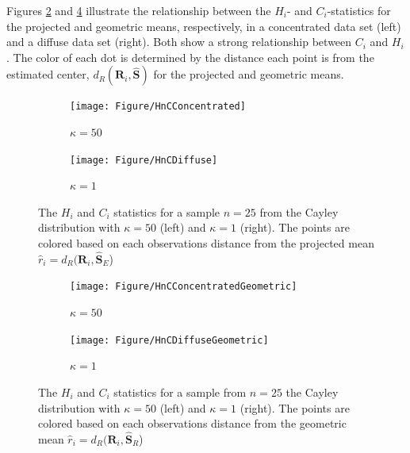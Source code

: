 \documentclass{article}\usepackage[]{graphicx}\usepackage[]{color}
\newcommand{\ProjMean}{{\widehat{\bm S}_{E}}}
\newcommand{\GeomMean}{{\widehat{\bm S}_{R}}}
\newcommand{\Sest}{{\widehat{\bm S}}}
\begin{document}

Figures \ref{fig:HnC} and \ref{fig:HnCGeom} illustrate the relationship between the $H_i$- and $C_i$-statistics for the projected and geometric means, respectively, in a concentrated data set (left) and a diffuse data set (right).  Both show a strong relationship between $C_i$ and $H_i$.  The color of each dot is determined by the distance each point is from the estimated center, $d_R(\bm R_i,\Sest)$ for the projected and geometric means.

\begin{figure}
\centering
\begin{subfigure}[b]{0.45\textwidth}
        \texttt{[image: Figure/HnCConcentrated]}
        \caption{$\kappa=50$}
\end{subfigure}
\begin{subfigure}[b]{0.45\textwidth}
        \texttt{[image: Figure/HnCDiffuse]}
        \caption{$\kappa=1$}
        \label{fig:HnDiff}
\end{subfigure}
\caption{The $H_i$ and $C_i$ statistics for a sample $n=25$ from the Cayley distribution with $\kappa=50$ (left) and $\kappa=1$ (right).  The points are colored based on each observations distance from the projected mean $\hat r_i=d_R(\bm R_i,\ProjMean$)}
\label{fig:HnC}
\end{figure}

\begin{figure}
\centering
\begin{subfigure}[b]{0.45\textwidth}
        \texttt{[image: Figure/HnCConcentratedGeometric]}
        \caption{$\kappa=50$}
\end{subfigure}
\begin{subfigure}[b]{0.45\textwidth}
        \texttt{[image: Figure/HnCDiffuseGeometric]}
        \caption{$\kappa=1$}
        \label{fig:HnDiffGeom}
\end{subfigure}
\caption{The $H_i$ and $C_i$ statistics for a sample from $n=25$ the Cayley distribution with $\kappa=50$ (left) and $\kappa=1$ (right).  The points are colored based on each observations distance from the geometric mean $\hat r_i=d_R(\bm R_i,\GeomMean$)}
\label{fig:HnCGeom}
\end{figure}
\end{document}
